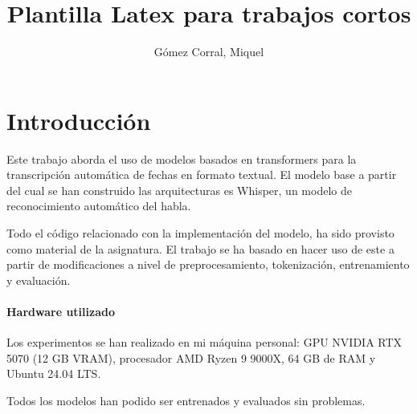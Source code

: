 \documentclass[11pt,spanish,listoffigures,listoftables]{tfgetsinf}
\title{Plantilla Latex para trabajos cortos}
\author{Gómez Corral, Miquel}
\begin{document}
 









\mainmatter

\chapter{Introducción}
Este trabajo aborda el uso de modelos basados en transformers para la transcripción automática de fechas en formato textual. El modelo base a partir del cual se han construido las arquitecturas es Whisper, un modelo de reconocimiento automático del habla. 

Todo el código relacionado con la implementación del modelo, ha sido provisto como material de la asignatura. El trabajo se ha basado en hacer uso de este a partir de modificaciones a nivel de preprocesamiento, tokenización, entrenamiento y evaluación.

\subsubsection{Hardware utilizado}
Los experimentos se han realizado en mi máquina personal: GPU NVIDIA RTX 5070 (12 GB VRAM), procesador AMD Ryzen 9 9000X, 64 GB de RAM y Ubuntu 24.04 LTS.

Todos los modelos han podido ser entrenados y evaluados sin problemas. 
\end{document}
